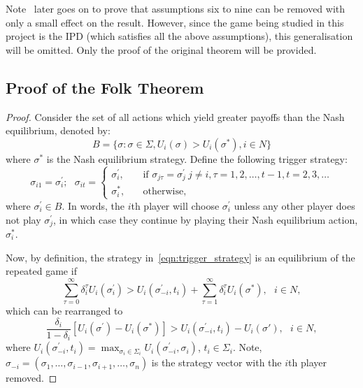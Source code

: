 Note~\cite{friedman1971non} later goes on to prove that assumptions
six to nine can be removed with only a small effect on the result. However,
since the game being studied in this project is the IPD (which satisfies
all the above assumptions), this generalisation will be omitted. Only the
proof of the original theorem will be provided.

\subsection{Proof of the Folk Theorem}

\begin{proof}
    Consider the set of all actions which yield greater payoffs than the Nash
    equilibrium, denoted by:
    \begin{equation}
        B = \{\sigma : \sigma \in \Sigma, U_{i}(\sigma) > U_{i}(\sigma^{*}), i \in N\}
    \end{equation}
    where \(\sigma^{*}\) is the Nash equilibrium strategy. Define the following trigger strategy:
    \begin{equation}
        \sigma_{i1} = \sigma_{i}^{\prime};~~~
        \sigma_{it} = \begin{cases}
            \sigma_{i}^{\prime}, & \quad \text{if } \sigma_{j\tau}=\sigma_{j}^{\prime} \ j \ne i, \tau=1, 2, \ldots, t-1, t=2, 3, \ldots \\
            \sigma_{i}^{*}, & \quad \text{otherwise},
        \end{cases}
    \end{equation}\label{eqn:trigger_strategy}
    where \(\sigma_{i}^{\prime} \in B\). In words, the \(i\)th player will choose \(\sigma_{i}^{\prime}\) unless any
    other player does not play \( \sigma_{j}^{\prime}\), in which case they
    continue by playing their Nash equilibrium action, \(\sigma_{i}^{*}\). 
    
    Now, by definition, the strategy in~\eqref{eqn:trigger_strategy} is an
    equilibrium of the repeated game if 
    \begin{equation}
        \sum_{\tau=0}^{\infty}{\delta_{i}^{\tau}U_{i}(\sigma_{i}^{\prime})} > U_{i}(\sigma_{-i}^{\prime}, t_{i}) + \sum_{\tau=1}^{\infty}{\delta_{i}^{\tau}U_{i}(\sigma^{*})},~~~ i \in N,
    \end{equation}
    which can be rearranged to 
    \begin{equation}
        \frac{\delta_{i}}{1-\delta_{i}}[U_{i}(\sigma^{\prime}) - U_{i}(\sigma^{*})] > U_{i}(\sigma_{-i}^{\prime}, t_{i}) - U_{i}(\sigma{\prime}),~~~ i \in N,
    \end{equation}
    where \(U_{i}(\sigma_{-i}^{\prime}, t_{i}) = \max_{\sigma_{i} \in
    \Sigma_{i}}{U_{i}(\sigma_{-i}^{\prime}, \sigma_{i})}\), \(t_{i} \in
    \Sigma_{i}\). Note, \(\sigma_{-i} = (\sigma_{1}, \ldots, \sigma_{i-1},
    \sigma_{i+1}, \ldots, \sigma_{n})\) is the strategy vector with the \(i\)th
    player removed.


\end{proof}
